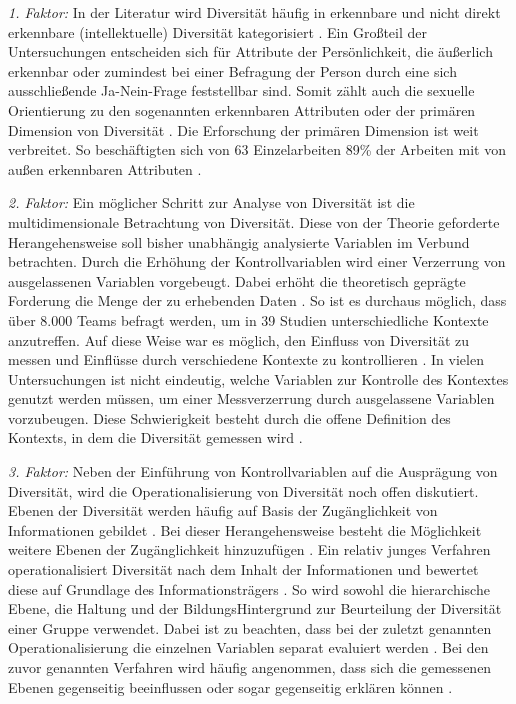 \documentclass[12pt,a4paper,oneside]{article}
\begin{document}
\begin{titlepage}
\begin{flushleft}
\textit{1. Faktor:} In der Literatur wird Diversität häufig in erkennbare und nicht direkt erkennbare (intellektuelle) Diversität kategorisiert \cite{harrison1998beyond,lapid1998diversity}. Ein Großteil der Untersuchungen entscheiden sich für Attribute der Persönlichkeit, die äußerlich erkennbar oder zumindest bei einer Befragung der Person durch eine sich ausschließende Ja-Nein-Frage feststellbar sind. Somit zählt auch die sexuelle Orientierung zu den sogenannten erkennbaren Attributen oder der primären Dimension von Diversität \cite{lapid1998diversity}. Die Erforschung der primären Dimension ist weit verbreitet. So beschäftigten sich von 63 Einzelarbeiten 89\% der Arbeiten mit von außen erkennbaren Attributen \cite[S. 804]{jackson2003recent}.

\textit{2. Faktor:} Ein möglicher Schritt zur Analyse von Diversität ist die multidimensionale Betrachtung von Diversität. Diese von der Theorie geforderte Herangehensweise soll bisher unabhängig analysierte Variablen im Verbund betrachten. Durch die Erhöhung der Kontrollvariablen wird einer Verzerrung von ausgelassenen Variablen vorgebeugt. Dabei erhöht die theoretisch geprägte Forderung die Menge der zu erhebenden Daten \cite{jackson2004diversity,joshi2009role}. So ist es durchaus möglich, dass über 8.000 Teams befragt werden, um in 39 Studien unterschiedliche Kontexte anzutreffen. Auf diese Weise war es möglich, den Einfluss von Diversität zu messen und Einflüsse durch verschiedene Kontexte zu kontrollieren \cite{joshi2009role}. In vielen Untersuchungen ist nicht eindeutig, welche Variablen zur Kontrolle des Kontextes genutzt werden müssen, um einer Messverzerrung durch ausgelassene Variablen vorzubeugen. Diese Schwierigkeit besteht durch die offene Definition des Kontexts, in dem die Diversität gemessen wird \cite[S. 812]{jackson2003recent}. 

\textit{3. Faktor:} Neben der Einführung von Kontrollvariablen auf die Ausprägung von Diversität, wird die Operationalisierung von Diversität noch offen diskutiert. Ebenen der Diversität werden häufig auf Basis der Zugäng\-lich\-keit von Informationen gebildet \cite{harrison1998beyond}. Bei dieser Herangehensweise besteht die Möglichkeit weitere Ebenen der Zugänglichkeit hinzuzufügen \cite{lapid1998diversity}. Ein relativ junges Verfahren operationalisiert Diversität nach dem Inhalt der Informationen und bewertet diese auf Grundlage des Informationsträgers \cite{harrison2007s}. So wird sowohl die hierarchische Ebene, die Haltung und der Bildungs\-Hintergrund zur Beurteilung der Diversität einer Gruppe verwendet. Dabei ist zu beachten, dass bei der zuletzt genannten Operationalisierung die einzelnen Variablen separat evaluiert werden \cite{harrison2007s}. Bei den zuvor genannten Verfahren wird häufig angenommen, dass sich die gemessenen Ebenen gegenseitig beeinflussen oder sogar gegenseitig erklären können \cite{lawrence1997perspective,harrison1998beyond,lapid1998diversity}.



\end{flushleft}
\end{titlepage}
\end{document}
